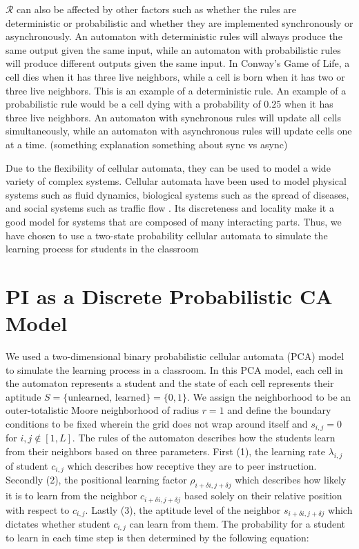 $\mathcal{R}$ can also be affected by other factors such as whether the rules are deterministic or probabilistic and whether they are implemented synchronously or asynchronously. An automaton with deterministic rules will always produce the same output given the same input, while an automaton with probabilistic rules will produce different outputs given the same input. In Conway's Game of Life, a cell dies when it has three live neighbors, while a cell is born when it has two or three live neighbors. This is an example of a deterministic rule. An example of a probabilistic rule would be a cell dying with a probability of $0.25$ when it has three live neighbors. An automaton with synchronous rules will update all cells simultaneously, while an automaton with asynchronous rules will update cells one at a time. (something explanation something about sync vs async)


Due to the flexibility of cellular automata, they can be used to model a wide variety of complex systems. Cellular automata have been used to model physical systems such as fluid dynamics, biological systems such as the spread of diseases, and social systems such as traffic flow \cite{louis2018probabilistic}. Its discreteness and locality make it a good model for systems that are composed of many interacting parts. Thus, we have chosen to use a two-state probability cellular automata to simulate the learning process for students in the classroom


\section{PI as a Discrete Probabilistic CA Model}

We used a two-dimensional binary probabilistic cellular automata (PCA) model to simulate the learning process in a classroom. In this PCA model, each cell in the automaton represents a student and the state of each cell represents their aptitude $S=\lbrace\text{unlearned, learned}\rbrace=\lbrace 0,1 \rbrace$. We assign the neighborhood to be an outer-totalistic Moore neighborhood of radius $r=1$ and define the boundary conditions to be fixed wherein the grid does not wrap around itself and $s_{i,j} = 0$ for ${i,j \notin [1,L]}$. The rules of the automaton describes how the students learn from their neighbors based on three parameters. First (1), the learning rate $\lambda_{i,j}$ of student $c_{i,j}$ which describes how receptive they are to peer instruction. Secondly (2), the positional learning factor $\rho_{i+\delta i, j+\delta j}$ which describes how likely it is to learn from the neighbor $c_{i+\delta i, j+\delta j}$ based solely on their relative position with respect to $c_{i,j}$. Lastly (3), the aptitude level of the neighbor $s_{i+\delta i, j+\delta j}$ which dictates whether student $c_{i,j}$ can learn from them. The probability for a student to learn in each time step is then determined by the following equation:

